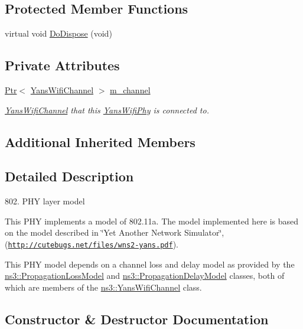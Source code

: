 \subsection*{Protected Member Functions}
\begin{DoxyCompactItemize}
\item 
virtual void \hyperlink{classns3_1_1YansWifiPhy_a4bb3f6f2bfb153622fbec833a5ecb413}{Do\+Dispose} (void)
\end{DoxyCompactItemize}
\subsection*{Private Attributes}
\begin{DoxyCompactItemize}
\item 
\hyperlink{classns3_1_1Ptr}{Ptr}$<$ \hyperlink{classns3_1_1YansWifiChannel}{Yans\+Wifi\+Channel} $>$ \hyperlink{classns3_1_1YansWifiPhy_a27c24e0706f1e8fcc64253d9fbcf18af}{m\+\_\+channel}
\begin{DoxyCompactList}\small\item\em \hyperlink{classns3_1_1YansWifiChannel}{Yans\+Wifi\+Channel} that this \hyperlink{classns3_1_1YansWifiPhy}{Yans\+Wifi\+Phy} is connected to. \end{DoxyCompactList}\end{DoxyCompactItemize}
\subsection*{Additional Inherited Members}


\subsection{Detailed Description}
802. P\+HY layer model

This P\+HY implements a model of 802.\+11a. The model implemented here is based on the model described in \char`\"{}\+Yet Another Network Simulator\char`\"{}, (\href{http://cutebugs.net/files/wns2-yans.pdf}{\tt http\+://cutebugs.\+net/files/wns2-\/yans.\+pdf}). 

This P\+HY model depends on a channel loss and delay model as provided by the \hyperlink{classns3_1_1PropagationLossModel}{ns3\+::\+Propagation\+Loss\+Model} and \hyperlink{classns3_1_1PropagationDelayModel}{ns3\+::\+Propagation\+Delay\+Model} classes, both of which are members of the \hyperlink{classns3_1_1YansWifiChannel}{ns3\+::\+Yans\+Wifi\+Channel} class. 

\subsection{Constructor \& Destructor Documentation}
